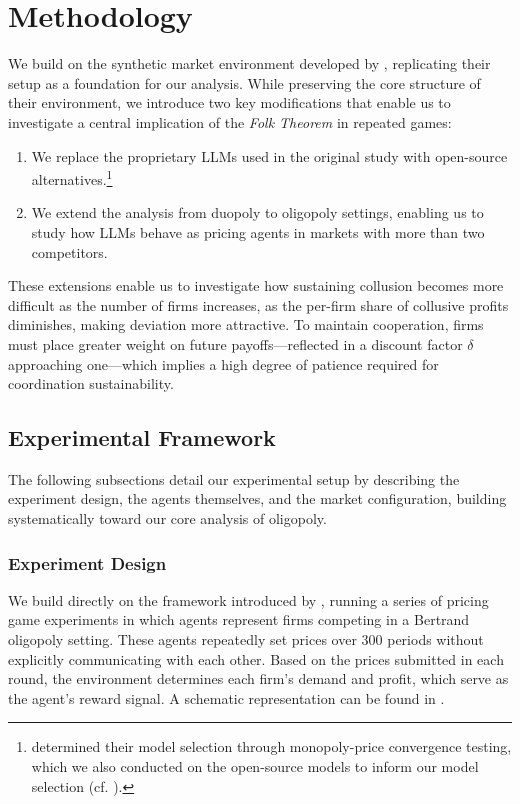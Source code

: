 \section{Methodology}\label{sec:meth}

We build on the synthetic market environment developed by \textcite{fish_algorithmic_2025}, replicating their setup as a foundation for our analysis. While preserving the core structure of their environment, we introduce two key modifications that enable us to investigate a central implication of the \emph{Folk Theorem} in repeated games:
\begin{enumerate}[noitemsep]
    \item We replace the proprietary LLMs used in the original study with open-source alternatives.\footnote{\noindent\textcite{fish_algorithmic_2025} determined their model selection through monopoly-price convergence testing, which we also conducted on the open-source models to inform our model selection (cf. ).} 
    \item We extend the analysis from duopoly to oligopoly settings, enabling us to study how LLMs behave as pricing agents in markets with more than two competitors. 
\end{enumerate}

These extensions enable us to investigate how sustaining collusion becomes more difficult as the number of firms increases, as the per-firm share of collusive profits diminishes, making deviation more attractive. To maintain cooperation, firms must place greater weight on future payoffs—reflected in a discount factor $\delta$ approaching one—which implies a high degree of patience required for coordination sustainability.

\subsection{Experimental Framework}

The following subsections detail our experimental setup by describing the experiment design, the agents themselves, and the market configuration, building systematically toward our core analysis of oligopoly.

\subsubsection*{Experiment Design}

We build directly on the framework introduced by \textcite{fish_algorithmic_2025}, running a series of pricing game experiments in which agents represent firms competing in a Bertrand oligopoly setting. These agents repeatedly set prices over 300 periods without explicitly communicating with each other. Based on the prices submitted in each round, the environment determines each firm's demand and profit, which serve as the agent's reward signal. A schematic representation can be found in .

